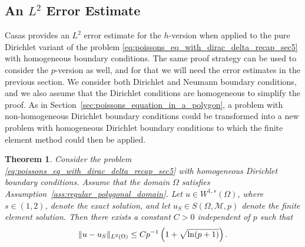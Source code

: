 \documentclass[english, 12pt, a4paper, sci, utf8, a-2b, online]{aaltothesis}
\theoremstyle{definition}
\theoremstyle{plain}
\newtheorem{theorem}{Theorem}[section]
\DeclarePairedDelimiter\norm{\lVert}{\rVert}
\numberwithin{equation}{section}
\begin{document}
\subsection{An \texorpdfstring{$L^2$}{L2} Error Estimate}
\label{subsec:p_fem_L2_convergence_analytically}

Casas \cite{casas1985} provides an $L^2$ error estimate for the $h$-version
when applied to the pure Dirichlet variant of the problem
\eqref{eq:poissons_eq_with_dirac_delta_recap_sec5} with homogeneous boundary conditions.
The same proof strategy can be used to consider the $p$-version as well,
and for that we will need the error estimates in the previous section.
We consider both Dirichlet and Neumann boundary conditions,
and we also assume that the Dirichlet conditions are homogeneous to simplify the proof.
As in Section~\ref{sec:poissons_equation_in_a_polygon},
a problem with non-homogeneous Dirichlet boundary conditions could be transformed
into a new problem with homogeneous Dirichlet boundary conditions to which
the finite element method could then be applied.
\begin{theorem}
    \label{thm:L2_convergence_of_p_version_dirac_load}
    Consider the problem \eqref{eq:poissons_eq_with_dirac_delta_recap_sec5}
    with homogeneous Dirichlet boundary conditions.
    Assume that the domain $\Omega$ satisfies Assumption~\ref{ass:regular_polygonal_domain}.
    Let $u \in W^{1,s}(\Omega)$, where $s \in (1,2)$, denote the exact solution, and
    let $u_S \in S(\Omega,\mathcal{M},p)$ denote the finite element solution.
    Then there exists a constant $C > 0$ independent of $p$ such that
    \begin{equation*}
        \norm{u - u_S}_{L^2(\Omega)} \leq C p^{-1} \left( 1 + \sqrt{\ln(p+1)} \right).
    \end{equation*}
\end{theorem}
\end{document}
